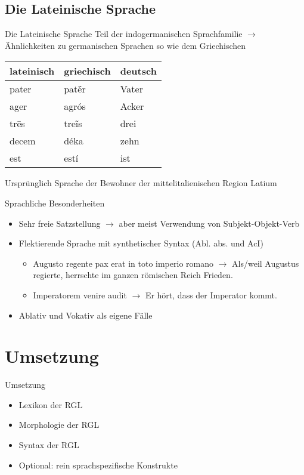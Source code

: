 \documentclass{beamer}
\begin{document}
\subsection{Die Lateinische Sprache}
\begin{frame}[fragile]{Die Lateinische Sprache}
Teil der indogermanischen Sprachfamilie $\rightarrow$ Ähnlichkeiten zu germanischen Sprachen so wie dem Griechischen \\
\begin{center}
\begin{tabular}{|l|l|l|}
  \hline
  lateinisch & griechisch & deutsch \\
  \hline
  pater & patḗr & Vater \\
  ager & agrós & Acker \\
  trēs & treĩs & drei \\
  decem & déka & zehn \\
  est & estí & ist \\
  \hline
\end{tabular}
\end{center}
Ursprünglich Sprache der Bewohner der mittelitalienischen Region Latium
\end{frame}
\begin{frame}{Sprachliche Besonderheiten}
\begin{itemize}
  \item Sehr freie Satzstellung $\rightarrow$ aber meist Verwendung von Subjekt-Objekt-Verb
  \item Flektierende Sprache mit synthetischer Syntax (Abl. abs. und AcI)
    \begin{itemize}
      \item Augusto regente pax erat in toto imperio romano $\rightarrow$ Als/weil Augustus regierte, herrschte im ganzen römischen Reich Frieden.
      \item Imperatorem venire audit $\rightarrow$ Er hört, dass der Imperator kommt.
    \end{itemize}
  \item Ablativ und Vokativ als eigene Fälle
\end{itemize}
\end{frame}
\section{Umsetzung}
\begin{frame}{Umsetzung}
\begin{itemize}
  \item Lexikon der RGL
  \item Morphologie der RGL
  \item Syntax der RGL
  \item Optional: rein sprachspezifische Konstrukte
\end{itemize}
\end{frame}
\end{document}
